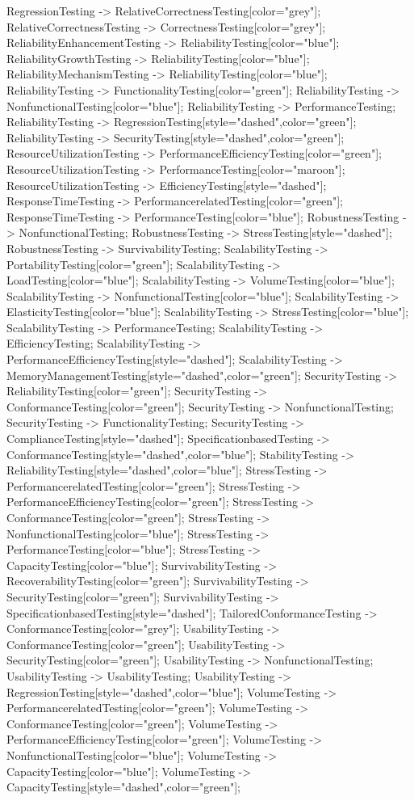 \documentclass{article}
\begin{document}
{RegressionTesting -> RelativeCorrectnessTesting[color="grey"];
RelativeCorrectnessTesting -> CorrectnessTesting[color="grey"];
ReliabilityEnhancementTesting -> ReliabilityTesting[color="blue"];
ReliabilityGrowthTesting -> ReliabilityTesting[color="blue"];
ReliabilityMechanismTesting -> ReliabilityTesting[color="blue"];
ReliabilityTesting -> FunctionalityTesting[color="green"];
ReliabilityTesting -> NonfunctionalTesting[color="blue"];
ReliabilityTesting -> PerformanceTesting;
ReliabilityTesting -> RegressionTesting[style="dashed",color="green"];
ReliabilityTesting -> SecurityTesting[style="dashed",color="green"];
ResourceUtilizationTesting -> PerformanceEfficiencyTesting[color="green"];
ResourceUtilizationTesting -> PerformanceTesting[color="maroon"];
ResourceUtilizationTesting -> EfficiencyTesting[style="dashed"];
ResponseTimeTesting -> PerformancerelatedTesting[color="green"];
ResponseTimeTesting -> PerformanceTesting[color="blue"];
RobustnessTesting -> NonfunctionalTesting;
RobustnessTesting -> StressTesting[style="dashed"];
RobustnessTesting -> SurvivabilityTesting;
ScalabilityTesting -> PortabilityTesting[color="green"];
ScalabilityTesting -> LoadTesting[color="blue"];
ScalabilityTesting -> VolumeTesting[color="blue"];
ScalabilityTesting -> NonfunctionalTesting[color="blue"];
ScalabilityTesting -> ElasticityTesting[color="blue"];
ScalabilityTesting -> StressTesting[color="blue"];
ScalabilityTesting -> PerformanceTesting;
ScalabilityTesting -> EfficiencyTesting;
ScalabilityTesting -> PerformanceEfficiencyTesting[style="dashed"];
ScalabilityTesting -> MemoryManagementTesting[style="dashed",color="green"];
SecurityTesting -> ReliabilityTesting[color="green"];
SecurityTesting -> ConformanceTesting[color="green"];
SecurityTesting -> NonfunctionalTesting;
SecurityTesting -> FunctionalityTesting;
SecurityTesting -> ComplianceTesting[style="dashed"];
SpecificationbasedTesting -> ConformanceTesting[style="dashed",color="blue"];
StabilityTesting -> ReliabilityTesting[style="dashed",color="blue"];
StressTesting -> PerformancerelatedTesting[color="green"];
StressTesting -> PerformanceEfficiencyTesting[color="green"];
StressTesting -> ConformanceTesting[color="green"];
StressTesting -> NonfunctionalTesting[color="blue"];
StressTesting -> PerformanceTesting[color="blue"];
StressTesting -> CapacityTesting[color="blue"];
SurvivabilityTesting -> RecoverabilityTesting[color="green"];
SurvivabilityTesting -> SecurityTesting[color="green"];
SurvivabilityTesting -> SpecificationbasedTesting[style="dashed"];
TailoredConformanceTesting -> ConformanceTesting[color="grey"];
UsabilityTesting -> ConformanceTesting[color="green"];
UsabilityTesting -> SecurityTesting[color="green"];
UsabilityTesting -> NonfunctionalTesting;
UsabilityTesting -> UsabilityTesting;
UsabilityTesting -> RegressionTesting[style="dashed",color="blue"];
VolumeTesting -> PerformancerelatedTesting[color="green"];
VolumeTesting -> ConformanceTesting[color="green"];
VolumeTesting -> PerformanceEfficiencyTesting[color="green"];
VolumeTesting -> NonfunctionalTesting[color="blue"];
VolumeTesting -> CapacityTesting[color="blue"];
VolumeTesting -> CapacityTesting[style="dashed",color="green"];

}
\end{document}
